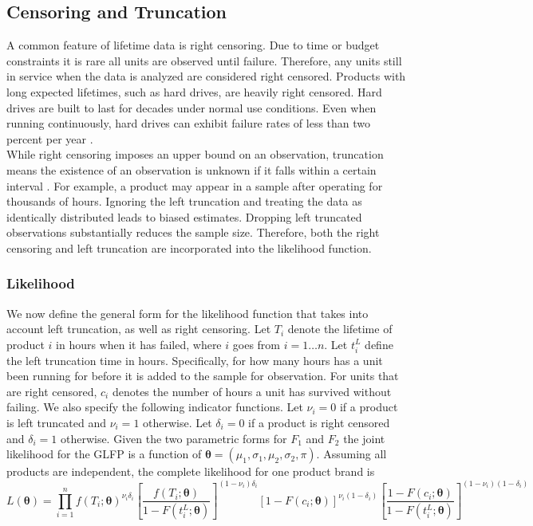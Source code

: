 \documentclass[12pt]{article}
\begin{document}
\subsection{Censoring and Truncation}
A common feature of lifetime data is right censoring.  Due to time or budget constraints it is rare all units are observed until failure.  Therefore, any units still in service when the data is analyzed are considered right censored.  Products with long expected lifetimes, such as hard drives, are heavily right censored.  Hard drives are built to last for decades under normal use conditions.  Even when running continuously, hard drives can exhibit failure rates of less than two percent per year \cite{backblaze}.  \\

While right censoring imposes an upper bound on an observation, truncation means the existence of an observation is unknown if it falls within a certain interval \cite{meeker}.  For example, a product may appear in a sample after operating for thousands of hours.   Ignoring the left truncation and treating the data as identically distributed leads to biased estimates.  Dropping left truncated observations substantially reduces the sample size.  Therefore, both the right censoring and left truncation are incorporated into the likelihood function. 

\subsubsection{Likelihood}
We now define the general form for the likelihood function that takes into account left truncation, as well as right censoring.  Let $T_{i}$ denote the lifetime of product $i$ in hours when it has failed, where $i$ goes from $i=1 \dots n$.  Let $t_i^L$ define the left truncation time in hours.  Specifically, for how many hours has a unit been running for before it is added to the sample for observation.  For units that are right censored, $c_i$ denotes the number of hours a unit has survived without failing.  We also specify the following indicator functions.  Let $\nu_i=0$ if a product is left truncated and $\nu_i=1$ otherwise.  Let $\delta_i=0$ if a product is right censored and $\delta_i=1$ otherwise.  Given the two parametric forms for $F_1$ and $F_2$ the joint likelihood for the GLFP is a function of $\bm{\theta} = (\mu_1, \sigma_1, \mu_2, \sigma_2, \pi)$.  Assuming all products are independent, the complete likelihood for one product brand is
\begin{equation*}
L(\bm{\theta})= \prod_{i=1}^{n} f(T_i; \bm{\theta})^{\nu_i\delta_i} \left[\frac{f(T_i;\bm{\theta})}{1-F(t_i^L;\bm{\theta})}\right]^{(1-\nu_i) \delta_i}
[1-F(c_i;\bm{\theta})]^{\nu_i (1-\delta_i)} \left[ \frac{1-F(c_i;\bm{\theta})}{1-F(t_i^L;\bm{\theta})} \right]^{(1-\nu_i)(1-\delta_i)}
\end{equation*}
\end{document}
